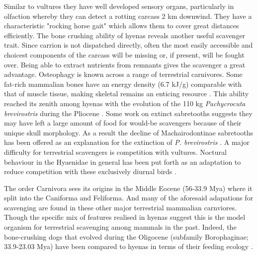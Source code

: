 \documentclass[a4paper,12pt]{article}
\begin{document}
Similar to vultures they have well developed sensory organs, particularly in olfaction whereby they can detect a rotting carcass 2 km downwind. They have a characteristic "rocking horse gait" which allows them to cover great distances efficiently. The bone crushing ability of hyenas reveals another useful scavenger trait. Since carrion is not dispatched directly, often the most easily accessible and choicest components of the carcass will be missing or, if present, will be fought over. Being able to extract nutrients from remnants gives the scavenger a great advantage. Osteophagy is known across a range of terrestrial carnivores. Some fat-rich mammalian bones have an energy density (6.7 kJ/g) comparable with that of muscle tissue, making skeletal remains an enticing resource \citep{brown1989study}. This ability reached its zenith among hyenas with the evolution of the 110 kg \textit{Pachycrocuta brevirostris} during the Pliocene \citep{palmqvist2011giant}. Some work on extinct sabretooths suggests they may have left a large amount of food for would-be scavengers because of their unique skull morphology. As a result the decline of Machairodontinae sabretooths has been offered as an explanation for the extinction of \textit{P. brevirostris} \citep{palmqvist2011giant}. A major difficulty for terrestrial scavengers is competition with vultures. Noctural behaviour in the Hyaenidae in general has been put forth as an adaptation to reduce competition with these exclusively diurnal birds \citep{gittleman2013carnivore}. 

The order Carnivora sees its origins in the Middle Eocene (56-33.9 Mya) %
where it split into the Caniforma and Feliforma. And many of the aforesaid adapations for scavenging are found in these other major terrestrial mammalian carnviores. Though the specific mix of features realised in hyenas suggest this is the model organism for terrestrial scavenging among mammals in the past. Indeed, the bone-crushing dogs that evolved during the Oligocene (subfamily Borophaginae; 33.9-23.03 Mya) have been compared to hyenas in terms of their feeding ecology \citep{van2003chapter,martin2016pursuit}. 
\end{document}
